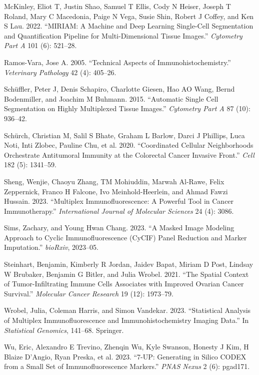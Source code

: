 \documentclass[
  letterpaper,
  DIV=11,
  numbers=noendperiod,
  oneside]{scrreprt}
\newlength{\cslhangindent}
\newlength{\cslentryspacingunit} %
\newenvironment{CSLReferences}[2] %
 {%
  \setlength{\parindent}{0pt}
  \ifodd #1
  \let\oldpar\par
  \def\par{\hangindent=\cslhangindent\oldpar}
  \fi
  \setlength{\parskip}{#2\cslentryspacingunit}
 }%
 {}
\begin{document}
\begin{CSLReferences}{1}{0}
\leavevmode{}%
McKinley, Eliot T, Justin Shao, Samuel T Ellis, Cody N Heiser, Joseph T
Roland, Mary C Macedonia, Paige N Vega, Susie Shin, Robert J Coffey, and
Ken S Lau. 2022. {``MIRIAM: A Machine and Deep Learning Single-Cell
Segmentation and Quantification Pipeline for Multi-Dimensional Tissue
Images.''} \emph{Cytometry Part A} 101 (6): 521--28.

\leavevmode{}%
Ramos-Vara, Jose A. 2005. {``Technical Aspects of
Immunohistochemistry.''} \emph{Veterinary Pathology} 42 (4): 405--26.

\leavevmode{}%
Schüffler, Peter J, Denis Schapiro, Charlotte Giesen, Hao AO Wang, Bernd
Bodenmiller, and Joachim M Buhmann. 2015. {``Automatic Single Cell
Segmentation on Highly Multiplexed Tissue Images.''} \emph{Cytometry
Part A} 87 (10): 936--42.

\leavevmode{}%
Schürch, Christian M, Salil S Bhate, Graham L Barlow, Darci J Phillips,
Luca Noti, Inti Zlobec, Pauline Chu, et al. 2020. {``Coordinated
Cellular Neighborhoods Orchestrate Antitumoral Immunity at the
Colorectal Cancer Invasive Front.''} \emph{Cell} 182 (5): 1341--59.

\leavevmode{}%
Sheng, Wenjie, Chaoyu Zhang, TM Mohiuddin, Marwah Al-Rawe, Felix
Zeppernick, Franco H Falcone, Ivo Meinhold-Heerlein, and Ahmad Fawzi
Hussain. 2023. {``Multiplex Immunofluorescence: A Powerful Tool in
Cancer Immunotherapy.''} \emph{International Journal of Molecular
Sciences} 24 (4): 3086.

\leavevmode{}%
Sims, Zachary, and Young Hwan Chang. 2023. {``A Masked Image Modeling
Approach to Cyclic Immunofluorescence (CyCIF) Panel Reduction and Marker
Imputation.''} \emph{bioRxiv}, 2023--05.

\leavevmode{}%
Steinhart, Benjamin, Kimberly R Jordan, Jaidev Bapat, Miriam D Post,
Lindsay W Brubaker, Benjamin G Bitler, and Julia Wrobel. 2021. {``The
Spatial Context of Tumor-Infiltrating Immune Cells Associates with
Improved Ovarian Cancer Survival.''} \emph{Molecular Cancer Research} 19
(12): 1973--79.

\leavevmode{}%
Wrobel, Julia, Coleman Harris, and Simon Vandekar. 2023. {``Statistical
Analysis of Multiplex Immunofluorescence and Immunohistochemistry
Imaging Data.''} In \emph{Statistical Genomics}, 141--68. Springer.

\leavevmode{}%
Wu, Eric, Alexandro E Trevino, Zhenqin Wu, Kyle Swanson, Honesty J Kim,
H Blaize D'Angio, Ryan Preska, et al. 2023. {``7-UP: Generating in
Silico CODEX from a Small Set of Immunofluorescence Markers.''}
\emph{PNAS Nexus} 2 (6): pgad171.

\end{CSLReferences}
\end{document}
